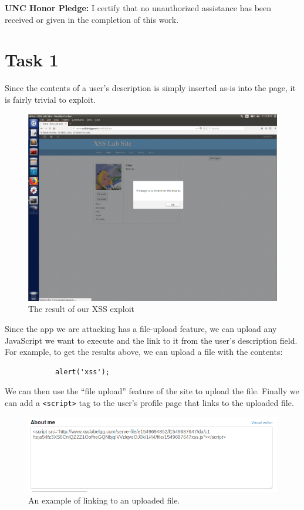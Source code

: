 \documentclass[12pt,letterpaper]{article}
\author{Chathan Driehuys}
\begin{document}
	\noindent \textbf{UNC Honor Pledge:} I certify that no unauthorized assistance has been received or given in the completion of this work.
	
	\vspace{.5in}
	
	\section*{Task 1}
		Since the contents of a user's description is simply inserted as-is into the page, it is fairly trivial to exploit.
		
		\begin{figure}[h]
			\includegraphics[width=\linewidth]{task-1-xss-example}
			\caption{The result of our XSS exploit}
		\end{figure}
	
		Since the app we are attacking has a file-upload feature, we can upload any JavaScript we want to execute and the link to it from the user's description field. For example, to get the results above, we can upload a file with the contents:
		
		\begin{verbatim}
			alert('xss');
		\end{verbatim}
		
		We can then use the ``file upload'' feature of the site to upload the file. Finally we can add a \texttt{<script>} tag to the user's profile page that links to the uploaded file.
		
		\begin{figure}[h!]
			\includegraphics[width=\linewidth]{task-1-about-me-content}
			\caption{An example of linking to an uploaded file.}
		\end{figure}
	
\end{document}
